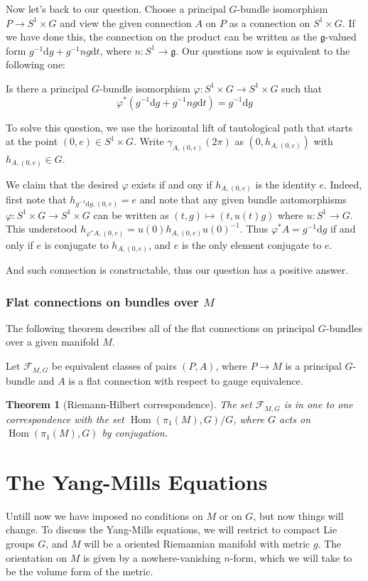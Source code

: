\documentclass[11pt]{amsart}
\numberwithin{equation}{section}
\theoremstyle{plain}
\theoremstyle{plain}
\newtheorem{thmsub}{Theorem}[subsection]
\numberwithin{equation}{section}
\begin{document}
Now let's back to our question. Choose a principal $G$-bundle isomorphism $P\to S^1\times G$ and view the given connection $A$ on $P$ as a connection on $S^1\times G$. If we have done this, the connection on the product can be written as the $\mathfrak{g}$-valued form $g^{-1}\mathrm{d}g+g^{-1}ng\mathrm{d}t$, where $n:S^1\to\mathfrak{g}$. Our questions now is equivalent to the following one:

Is there a principal $G$-bundle isomorphism $\varphi:S^1\times G\to S^1\times G$ such that 
$$
\varphi^*(g^{-1}\mathrm{d}g+g^{-1}ng\mathrm{d}t)=g^{-1}\mathrm{d}g
$$

To solve this question, we use the horizontal lift of tautological path that starts at the point $(0,e)\in S^1\times G$. Write $\gamma_{A,(0,e)}(2\pi)$ as $(0,h_{A,(0,e)})$ with $h_{A,(0,e)}\in G$.

We claim that the desired $\varphi$ exists if and ony if $h_{A,(0,e)}$ is the identity $e$. Indeed, first note that $h_{g^{-1}\mathrm{d}g,(0,e)}=e$ and note that any given bundle automorphisms $\varphi:S^1\times G\to S^1\times G$ can be written as $(t,g)\mapsto(t,u(t)g)$ where $u:S^1\to G$. This understood $h_{\varphi^*A,(0,e)}=u(0)h_{A,(0,e)}u(0)^{-1}$. Thus $\varphi^*A=g^{-1}\mathrm{d}g$ if and only if $e$ is conjugate to $h_{A,(0,e)}$, and $e$ is the only element conjugate to $e$.

And such connection is constructable, thus our question has a positive answer.
\subsubsection{Flat connections on bundles over $M$}
The following theorem describes all of the flat connections on principal $G$-bundles over a given manifold $M$. 

Let $\mathscr{F}_{M,G}$ be equivalent classes of pairs $(P,A)$, where $P\to M$ is a principal $G$-bundle and $A$ is a flat connection with respect to gauge equivalence.
\begin{thmsub}[Riemann-Hilbert correspondence]
The set $\mathscr{F}_{M,G}$ is in one to one correspondence with the set $\operatorname{Hom}(\pi_1(M),G)/G$, where $G$ acts on $\operatorname{Hom}(\pi_1(M),G)$ by conjugation.
\end{thmsub}

\section{The Yang-Mills Equations}
Untill now we have imposed no conditions on $M$ or on $G$, but now things will change. To discuss the Yang-Mills equations, we will restrict to compact Lie groups $G$, and $M$ will be a oriented Riemannian manifold with metric $g$. The orientation on $M$ is given by a nowhere-vanishing $n$-form, which we will take to be the volume form of the metric.
\end{document}
